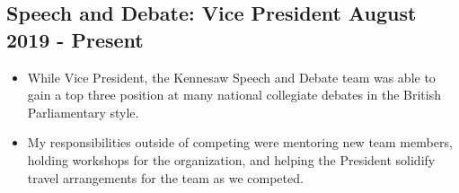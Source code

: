 \documentclass{article}
\begin{document}
\subsection{\large Speech and Debate: Vice President \hfill \small August 2019 - Present}
\begin{itemize}
\setlength\itemsep{.1em}
	\item While Vice President, the Kennesaw Speech and Debate team was able to gain a top three position at many national collegiate debates in the British Parliamentary style. 
	\item My responsibilities outside of competing were mentoring new team members, holding workshops for the organization, and helping the President solidify travel arrangements for the team as we competed. 
\end{itemize}
\end{document}
